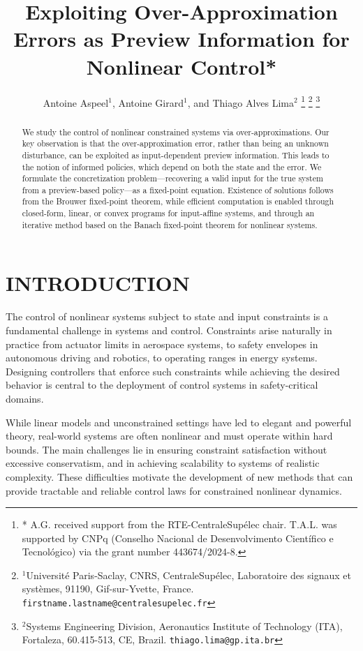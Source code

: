 \documentclass[letterpaper, 10 pt, conference]{ieeeconf}  %
\title{\LARGE \bf
Exploiting Over-Approximation Errors as Preview Information for Nonlinear Control*
}
\author{Antoine Aspeel$^{1}$, Antoine Girard$^{1}$, and Thiago Alves Lima$^{2}$%
\thanks{*
A.G. received support from the RTE-CentraleSup\'elec chair. T.A.L. was supported by CNPq (Conselho Nacional de Desenvolvimento Cient\'ifico e Tecnol\'{o}gico) via the grant number 443674/2024-8.}%
\thanks{$^{1}$Universit{\'e} Paris-Saclay, CNRS, CentraleSup{\'e}lec, Laboratoire des signaux et syst{\`e}mes, 91190, Gif-sur-Yvette, France.
{\tt\small firstname.lastname@centralesupelec.fr}}%
\thanks{$^{2}$Systems Engineering Division, Aeronautics Institute of Technology (ITA), Fortaleza, 60.415-513, CE, Brazil.
{\tt\small thiago.lima@gp.ita.br}}%
}
\begin{document}
\maketitle
\thispagestyle{empty}
\pagestyle{empty}



\begin{abstract}
We study the control of nonlinear constrained systems via over-approximations. Our key observation is that the over-approximation error, rather than being an unknown disturbance, can be exploited as input-dependent preview information. This leads to the notion of informed policies, which depend on both the state and the error. We formulate the concretization problem---recovering a valid input for the true system from a preview-based policy---as a fixed-point equation. Existence of solutions follows from the Brouwer fixed-point theorem, while efficient computation is enabled through closed-form, linear, or convex programs for input-affine systems, and through an iterative method based on the Banach fixed-point theorem for nonlinear systems.
\end{abstract}


\section{INTRODUCTION}

The control of nonlinear systems subject to state and input constraints is a fundamental challenge in systems and control. Constraints arise naturally in practice from actuator limits in aerospace systems, to safety envelopes in autonomous driving and robotics, to operating ranges in energy systems. Designing controllers that enforce such constraints while achieving the desired behavior is central to the deployment of control systems in safety-critical domains.

While linear models and unconstrained settings have led to elegant and powerful theory, real-world systems are often nonlinear and must operate within hard bounds. The main challenges lie in ensuring constraint satisfaction without excessive conservatism, and in achieving scalability to systems of realistic complexity. These difficulties motivate the development of new methods that can provide tractable and reliable control laws for constrained nonlinear dynamics.
\end{document}
